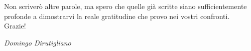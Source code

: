 Non scriverò altre parole, ma spero che quelle già scritte siano sufficientemente profonde a dimostrarvi la reale gratitudine che provo nei vostri confronti.\\

Grazie!\\
\begin{flushright}
    \textit{Domingo Dirutigliano}
\end{flushright}